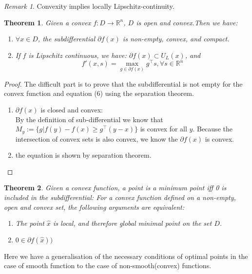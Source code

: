 \documentclass[a4paper,11pt,fleqn, draft]{book}
\newtheorem{theorem}{Theorem}[section]
\theoremstyle{definition}
\theoremstyle{remark}
\newtheorem*{remark}{Remark}
\begin{document}
\begin{remark}
Convexity implies locally Lipschitz-continuity. 	
\end{remark}

\begin{theorem}
	Given a convex $f: D \longrightarrow \mathbb{R}^n$, $D$ is open and convex.Then we have:
	\begin{enumerate}
		\item $\forall x \in D$, the subdifferential $\partial f(x)$ is non-empty, convex, and compact.
		\item If $f$ is Lipschitz continuous, we have: $\partial f(x) \subset U_L(x)$, and \begin{equation}
			f'(x,s) = \max_{g \in \partial f(x)}g^\top s, \forall s \in \mathbb{R}^n
		\end{equation}
	\end{enumerate} 
\end{theorem}

\begin{proof}
	The difficult part is to prove that the subdifferential is not empty for the convex function and equation (6) using the separation theorem.
	\begin{enumerate}
		\item $\partial f(x)$ is closed and convex:\\
		By the definition of sub-differential we know that $M_y := \{g | f(y) - f(x) \geq g^\top(y - x) \}$ is convex for all $y$. Because the intersection of convex sets is also convex, we know the $\partial f(x)$ is convex.
		\item  the equation is shown by separation theorem. 
	\end{enumerate}
\end{proof}

\begin{theorem}
Given a convex function, a point is a minimum point iff 0 is included in the subdifferential: For a convex function defined on a non-empty, open and convex set, the following arguments are equivalent:
	\begin{enumerate}
		\item The point $\hat{x}$ is local, and therefore global minimal point on the set $D$.
		\item $0 \in \partial f(\hat{x}))$
	\end{enumerate}
\end{theorem}

Here we have a generalisation of the necessary conditions of optimal points in the case of smooth function to the case of non-smooth(convex) functions.
\end{document}
